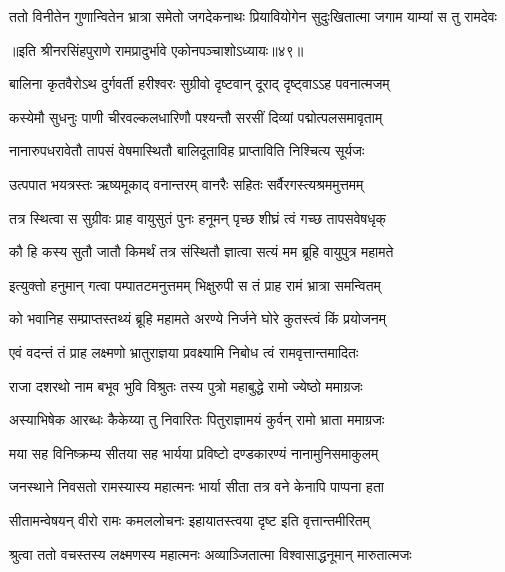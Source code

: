 \fourlineindentedshloka
{ततो विनीतेन गुणान्वितेन}
{भ्रात्रा समेतो जगदेकनाथः}
{प्रियावियोगेन सुदुःखितात्मा}
{जगाम याम्यां स तु रामदेवः} %

॥इति श्रीनरसिंहपुराणे रामप्रादुर्भावे एकोनपञ्चाशोऽध्यायः॥४९॥



\twolineshloka
{बालिना कृतवैरोऽथ दुर्गवर्ती हरीश्वरः}
{सुग्रीवो दृष्टवान् दूराद् दृष्ट्वाऽऽह पवनात्मजम्} %

\twolineshloka
{कस्येमौ सुधनुः पाणी चीरवल्कलधारिणौ}
{पश्यन्तौ सरसीं दिव्यां पद्मोत्पलसमावृताम्} %

\twolineshloka
{नानारुपधरावेतौ तापसं वेषमास्थितौ}
{बालिदूताविह प्राप्ताविति निश्चित्य सूर्यजः} %

\twolineshloka
{उत्पपात भयत्रस्तः ऋष्यमूकाद् वनान्तरम्}
{वानरैः सहितः सर्वैरगस्त्यश्रममुत्तमम्} %

\twolineshloka
{तत्र स्थित्वा स सुग्रीवः प्राह वायुसुतं पुनः}
{हनूमन् पृच्छ शीघ्रं त्वं गच्छ तापसवेषधृक्} %

\twolineshloka
{कौ हि कस्य सुतौ जातौ किमर्थं तत्र संस्थितौ}
{ज्ञात्वा सत्यं मम ब्रूहि वायुपुत्र महामते} %

\twolineshloka
{इत्युक्तो हनुमान् गत्वा पम्पातटमनुत्तमम्}
{भिक्षुरुपी स तं प्राह रामं भ्रात्रा समन्वितम्} %

\twolineshloka
{को भवानिह सम्प्राप्तस्तथ्यं ब्रूहि महामते}
{अरण्ये निर्जने घोरे कुतस्त्वं किं प्रयोजनम्} %

\twolineshloka
{एवं वदन्तं तं प्राह लक्ष्मणो भ्रातुराज्ञया}
{प्रवक्ष्यामि निबोध त्वं रामवृत्तान्तमादितः} %

\twolineshloka
{राजा दशरथो नाम बभूव भुवि विश्रुतः}
{तस्य पुत्रो महाबुद्धे रामो ज्येष्ठो ममाग्रजः} %

\twolineshloka
{अस्याभिषेक आरब्धः कैकेय्या तु निवारितः}
{पितुराज्ञामयं कुर्वन् रामो भ्राता ममाग्रजः} %

\twolineshloka
{मया सह विनिष्क्रम्य सीतया सह भार्यया}
{प्रविष्टो दण्डकारण्यं नानामुनिसमाकुलम्} %

\twolineshloka
{जनस्थाने निवसतो रामस्यास्य महात्मनः}
{भार्या सीता तत्र वने केनापि पाप्पना हता} %

\twolineshloka
{सीतामन्वेषयन् वीरो रामः कमललोचनः}
{इहायातस्त्वया दृष्ट इति वृत्तान्तमीरितम्} %

\twolineshloka
{श्रुत्वा ततो वचस्तस्य लक्ष्मणस्य महात्मनः}
{अव्याञ्जितात्मा विश्वासाद्धनूमान् मारुतात्मजः} %

